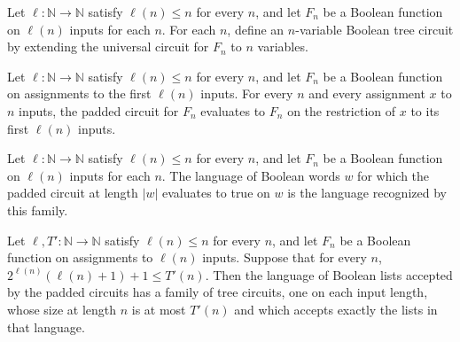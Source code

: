 \begin{definition}
\label{BoolCircuit.padFamily}
\leanok
{}
Let $\ell:\mathbb{N}\to\mathbb{N}$ satisfy $\ell(n)\le n$ for every $n$, and let $F_n$
be a Boolean function on $\ell(n)$ inputs for each $n$. For each $n$, define an
$n$-variable Boolean tree circuit by extending the universal circuit for $F_n$ to $n$
variables.
\end{definition}

\begin{theorem}
\label{BoolCircuit.padFamily_eval}
\leanok
{}
Let $\ell:\mathbb{N}\to\mathbb{N}$ satisfy $\ell(n)\le n$ for every $n$, and let $F_n$
be a Boolean function on assignments to the first $\ell(n)$ inputs. For every $n$ and
every assignment $x$ to $n$ inputs, the padded circuit for $F_n$ evaluates to $F_n$ on
the restriction of $x$ to its first $\ell(n)$ inputs.
\end{theorem}

\begin{definition}
\label{BoolCircuit.padLanguage}
\leanok
{}
Let $\ell:\mathbb{N}\to\mathbb{N}$ satisfy $\ell(n)\le n$ for every $n$, and let $F_n$
be a Boolean function on $\ell(n)$ inputs for each $n$. The language of Boolean words
$w$ for which the padded circuit at length $|w|$ evaluates to true on $w$ is the
language recognized by this family.
\end{definition}

\begin{theorem}
\label{BoolCircuit.padLanguage_inTreeSize}
\leanok
{}
Let $\ell,T':\mathbb{N}\to\mathbb{N}$ satisfy $\ell(n)\le n$ for every $n$, and let
$F_n$ be a Boolean function on assignments to $\ell(n)$ inputs. Suppose that for every
$n$, $2^{\ell(n)}(\ell(n)+1)+1\le T'(n)$. Then the language of Boolean lists accepted by
the padded circuits has a family of tree circuits, one on each input length, whose size
at length $n$ is at most $T'(n)$ and which accepts exactly the lists in that language.
\end{theorem}

